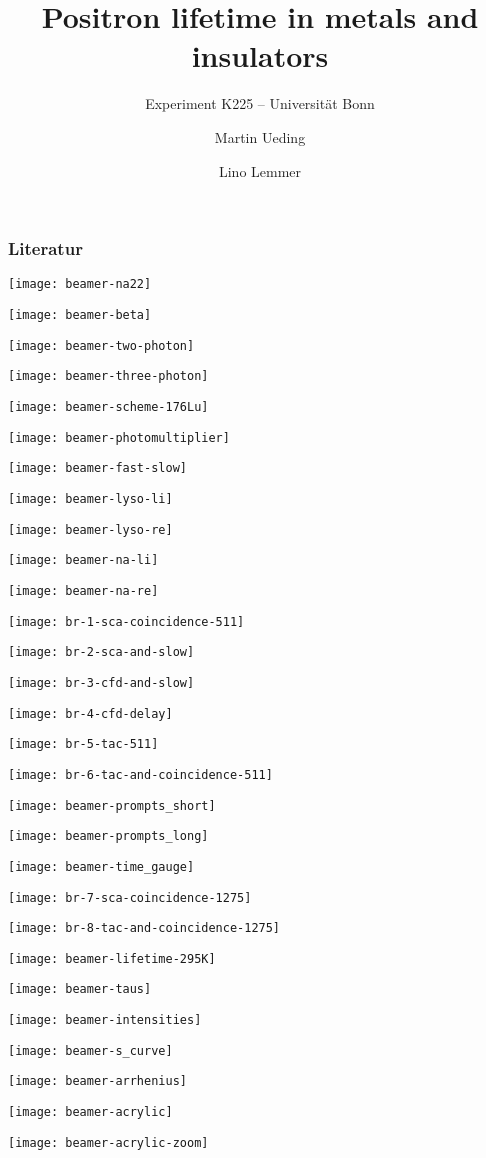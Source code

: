 \documentclass[english, fleqn]{beamer}
\title{Positron lifetime in metals and insulators}
\subtitle{Experiment K225 -- Universität Bonn}
\author{%
    Martin Ueding
    \and
    Lino Lemmer
}
\date{\daterange{2016-03-24}{2016-03-25}}
\begin{document}
\begin{frame}
    \titlepage
\end{frame}

\begin{frame}
    \frametitle{Literatur}

    \printbibliography
\end{frame}

\texttt{[image: beamer-na22]}

\texttt{[image: beamer-beta]}

\texttt{[image: beamer-two-photon]}

\texttt{[image: beamer-three-photon]}

\texttt{[image: beamer-scheme-176Lu]}

\texttt{[image: beamer-photomultiplier]}

\texttt{[image: beamer-fast-slow]}

\texttt{[image: beamer-lyso-li]}

\texttt{[image: beamer-lyso-re]}

\texttt{[image: beamer-na-li]}

\texttt{[image: beamer-na-re]}

\texttt{[image: br-1-sca-coincidence-511]}

\texttt{[image: br-2-sca-and-slow]}

\texttt{[image: br-3-cfd-and-slow]}

\texttt{[image: br-4-cfd-delay]}

\texttt{[image: br-5-tac-511]}

\texttt{[image: br-6-tac-and-coincidence-511]}

\texttt{[image: beamer-prompts\_short]}

\texttt{[image: beamer-prompts\_long]}

\texttt{[image: beamer-time\_gauge]}

\texttt{[image: br-7-sca-coincidence-1275]}

\texttt{[image: br-8-tac-and-coincidence-1275]}

\texttt{[image: beamer-lifetime-295K]}

\texttt{[image: beamer-taus]}

\texttt{[image: beamer-intensities]}

\texttt{[image: beamer-s\_curve]}

\texttt{[image: beamer-arrhenius]}

\texttt{[image: beamer-acrylic]}

\begin{frame}
    \texttt{[image: beamer-acrylic-zoom]}
\end{frame}


\end{document}
